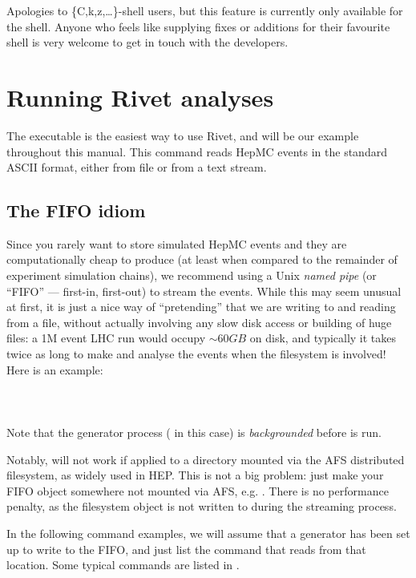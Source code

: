 \documentclass{JHEP3}
\begin{document}
Apologies to \{C,k,z,\dots\}-shell users, but this feature is currently only
available for the  shell. Anyone who feels like supplying fixes or
additions for their favourite shell is very welcome to get in touch with the
developers.



\section{Running Rivet analyses}
\label{sec:agile-runmc}

The  executable is the easiest way to use Rivet, and will be our
example throughout this manual. This command reads HepMC events in the standard
ASCII format, either from file or from a text stream.

\subsection{The FIFO idiom}
\label{sec:fifo-idiom}

Since you rarely want to store simulated HepMC events and they are
computationally cheap to produce (at least when compared to the remainder of
experiment simulation chains), we recommend using a Unix \emph{named pipe} (or
``FIFO'' --- first-in, first-out) to stream the events. While this may seem
unusual at first, it is just a nice way of ``pretending'' that we are writing to
and reading from a file, without actually involving any slow disk access or
building of huge files: a 1M event LHC run would occupy $\sim 60 GB$ on disk,
and typically it takes twice as long to make and analyse the events when the
filesystem is involved! Here is an example:\\
\\
\\
\\
%
Note that the generator process ( in this case) is
\emph{backgrounded} before  is run.

Notably,  will not work if applied to a directory mounted via the
AFS distributed filesystem, as widely used in HEP. This is not a big problem:
just make your FIFO object somewhere not mounted via AFS, e.g. . There
is no performance penalty, as the filesystem object is not written to during the
streaming process.

In the following command examples, we will assume that a generator has been set
up to write to the  FIFO, and just list the  command
that reads from that location. Some typical  commands are
listed in .
\end{document}
